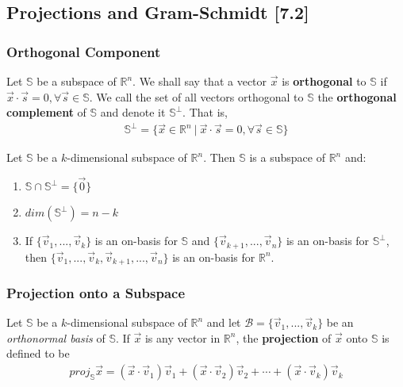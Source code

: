 \documentclass[a4paper,9pt]{extarticle}
\begin{document}
\begin{multicols*}{2}

\subsection{Projections and Gram-Schmidt [7.2]}


\subsubsection{Orthogonal Component}
Let $\mathbb{S}$ be a subspace of $\mathbb{R}^n$. We shall say that a vector $\vec{x}$ is \textbf{orthogonal} to $\mathbb{S}$ if $\vec{x} \cdot \vec{s} = 0, \forall \vec{s} \in \mathbb{S}$. We call the set of all vectors orthogonal to $\mathbb{S}$ the \textbf{orthogonal complement} of $\mathbb{S}$ and denote it $\mathbb{S}^\bot$. That is,
\begin{equation} \label{7.2-1}
    \begin{split}
        \mathbb{S}^\bot = \{\vec{x} \in \mathbb{R}^n \> | \> \vec{x} \cdot \vec{s} = 0, \forall \vec{s} \in \mathbb{S}\}
    \end{split}
\end{equation}

Let $\mathbb{S}$ be a $k$-dimensional subspace of $\mathbb{R}^n$. Then $\mathbb{S}$ is a subspace of $\mathbb{R}^n$ and:
\begin{enumerate}[label=\bfseries (\arabic*)] \itemsep0pt \parskip0pt 
    \item $\mathbb{S} \cap \mathbb{S}^\bot = \{\vec{0}\}$
    \item $dim(\mathbb{S}^\bot) = n - k$
    \item If $\{\vec{v}_1, ..., \vec{v}_k\}$ is an on-basis for $\mathbb{S}$ and $\{\vec{v}_{k + 1}, ..., \vec{v}_n\}$ is an on-basis for $\mathbb{S}^\bot$, then $\{\vec{v}_1, ..., \vec{v}_k, \vec{v}_{k + 1}, ..., \vec{v}_n\}$ is an on-basis for $\mathbb{R}^n$.
\end{enumerate}


\subsubsection{Projection onto a Subspace}
Let $\mathbb{S}$ be a $k$-dimensional subspace of $\mathbb{R}^n$ and let $\mathcal{B} = \{\vec{v}_1, ..., \vec{v}_k\}$ be an \textit{orthonormal basis} of $\mathbb{S}$. If $\vec{x}$ is any vector in $\mathbb{R}^n$, the \textbf{projection} of $\vec{x}$ onto $\mathbb{S}$ is defined to be
\begin{equation} \label{7.2-2}
    \begin{split}
        proj_\mathbb{S} \vec{x} = (\vec{x} \cdot \vec{v}_1) \vec{v}_1 + (\vec{x} \cdot \vec{v}_2) \vec{v}_2 + \cdots + (\vec{x} \cdot \vec{v}_k) \vec{v}_k
    \end{split}
\end{equation}


\end{multicols*}
\end{document}
